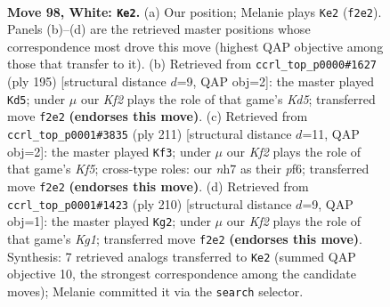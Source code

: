 \documentclass[11pt]{article}
\begin{document}
\clearpage

\begin{figure}[p]\centering
\begin{subfigure}{0.46\textwidth}\centering
\resizebox{\linewidth}{!}{%
\newchessgame
\chessboard[
  setfen={8/3k3n/PR6/8/8/7r/5K2/8 w - - 23 98},
  showmover=false,
  pgfstyle=straightmove, color=movearrow, markmove={f2-e2}
]}
\caption{}
\end{subfigure}\hfill
\begin{subfigure}{0.46\textwidth}\centering
\resizebox{\linewidth}{!}{%
\newchessgame
\chessboard[
  setfen={8/8/5K2/8/3k4/R7/N5r1/8 b - - 0 98},
  showmover=false,
  pgfstyle=straightmove, color=movearrow, markmove={d4-d5}
]}
\caption{}
\end{subfigure}
\\[4pt]
\begin{subfigure}{0.46\textwidth}\centering
\resizebox{\linewidth}{!}{%
\newchessgame
\chessboard[
  setfen={8/8/3R1P2/8/5kp1/8/r7/6K1 b - - 11 106},
  showmover=false,
  pgfstyle=straightmove, color=movearrow, markmove={f4-f3}
]}
\caption{}
\end{subfigure}\hfill
\begin{subfigure}{0.46\textwidth}\centering
\resizebox{\linewidth}{!}{%
\newchessgame
\chessboard[
  setfen={8/8/R5PP/8/4nk2/8/8/1r4K1 w - - 3 106},
  showmover=false,
  pgfstyle=straightmove, color=movearrow, markmove={g1-g2}
]}
\caption{}
\end{subfigure}
\caption{\textbf{Move 98, White: \texttt{Ke2}.} (a) Our position; Melanie plays \texttt{Ke2} (\texttt{f2e2}). Panels (b)--(d) are the retrieved master positions whose correspondence most drove this move (highest QAP objective among those that transfer to it). (b) Retrieved from \texttt{ccrl\_top\_p0000\#1627} (ply 195) [structural distance $d$=9, QAP obj=2]: the master played \texttt{Kd5}; under $\mu$ our \emph{Kf2} plays the role of that game's \emph{Kd5}; transferred move \texttt{f2e2} \textbf{(endorses this move)}. (c) Retrieved from \texttt{ccrl\_top\_p0001\#3835} (ply 211) [structural distance $d$=11, QAP obj=2]: the master played \texttt{Kf3}; under $\mu$ our \emph{Kf2} plays the role of that game's \emph{Kf5}; cross-type roles: our \emph{n}h7 as their \emph{p}f6; transferred move \texttt{f2e2} \textbf{(endorses this move)}. (d) Retrieved from \texttt{ccrl\_top\_p0001\#1423} (ply 210) [structural distance $d$=9, QAP obj=1]: the master played \texttt{Kg2}; under $\mu$ our \emph{Kf2} plays the role of that game's \emph{Kg1}; transferred move \texttt{f2e2} \textbf{(endorses this move)}. Synthesis: 7 retrieved analogs transferred to \texttt{Ke2} (summed QAP objective 10, the strongest correspondence among the candidate moves); Melanie committed it via the \texttt{search} selector.}
\label{fig:thought-m194}
\end{figure}
\end{document}

